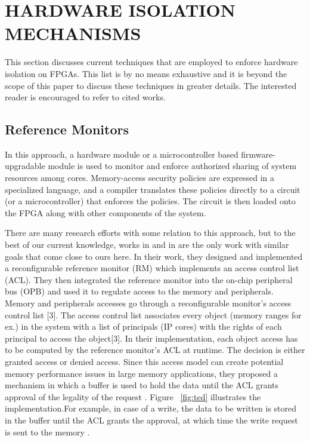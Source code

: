 \documentclass[sigconf]{acmart}
\theoremstyle{plain}
\theoremstyle{remark}
\begin{document}
\section{HARDWARE ISOLATION MECHANISMS} \label{sec:problem_definition}

This section discusses current techniques that are employed to enforce hardware isolation on FPGAs. This list is by no means exhaustive and it is beyond the scope of this paper to discuss these techniques in greater details. The interested reader is encouraged to refer to cited works.


\subsection{Reference Monitors}

In this approach, a hardware module or a microcontroller based firmware-upgradable module is used to monitor and enforce authorized sharing of system
resources among cores. Memory-access security policies are expressed in a specialized language, and a compiler translates these policies directly to a circuit (or a microcontroller) that enforces the policies. The circuit is then loaded onto the FPGA along with other components of the system.

There are many research efforts with some relation to this approach, but to the best of our current knowledge, works in \cite{HuffEmbedded} and in \cite{Huffmire} are the only work with similar goals that come close to ours here. In their work, they designed and implemented a reconfigurable reference monitor (RM) which implements an access control list (ACL). They then integrated the reference monitor into the on-chip peripheral bus (OPB) and used it to regulate access to the memory and peripherals. Memory and peripherals accesses go through a reconfigurable monitor's access control list [3]. The access control list associates every object (memory ranges for ex.) in the system with a list of principals (IP cores) with the rights of each principal to access the object[3]. In their implementation, each object access has to be computed by the reference monitor's ACL at runtime. The decision is either granted access or denied access. Since this access model can create potential memory performance issues in large memory applications, they proposed a mechanism in which a buffer is used to hold the data until the ACL grants approval of the legality of the request \cite{SPHuffmire}. Figure ~\ref{fig:ted} illustrates the implementation.For example, in case of a write, the data to be written is stored in the buffer until the ACL grants the approval, at which time the write request is sent to the memory \cite{SPHuffmire}.
\end{document}
